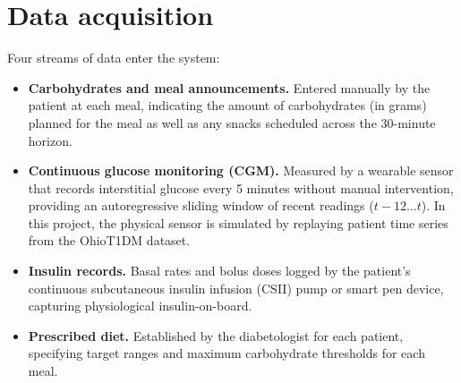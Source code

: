 \section{Data acquisition}
Four streams of data enter the system:
\begin{itemize}
  \item \textbf{Carbohydrates and meal announcements.} Entered manually by the patient at each meal, indicating the amount of carbohydrates (in grams) planned for the meal as well as any snacks scheduled across the 30-minute horizon.
  \item \textbf{Continuous glucose monitoring (CGM).} Measured by a wearable sensor that records interstitial glucose every 5 minutes without manual intervention, providing an autoregressive sliding window of recent readings ($t-12 \dots t$). In this project, the physical sensor is simulated by replaying patient time series from the OhioT1DM dataset.
  \item \textbf{Insulin records.} Basal rates and bolus doses logged by the patient's continuous subcutaneous insulin infusion (CSII) pump or smart pen device, capturing physiological insulin-on-board.
  \item \textbf{Prescribed diet.} Established by the diabetologist for each patient, specifying target ranges and maximum carbohydrate thresholds for each meal.
\end{itemize}
